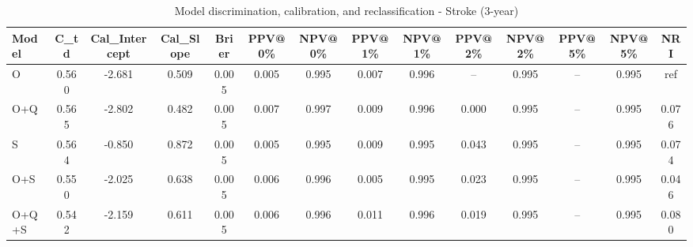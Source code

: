 \begin{table}[htbp]
\centering
\small
\caption{Model discrimination, calibration, and reclassification - Stroke (3-year)}
\label{tab:perf_stroke_3y}
\begin{tabular}{lccccccccccccc}
\toprule
Model & C\_td & Cal\_Intercept & Cal\_Slope & Brier & PPV@0\% & NPV@0\% & PPV@1\% & NPV@1\% & PPV@2\% & NPV@2\% & PPV@5\% & NPV@5\% & NRI \\
\midrule
O & 0.560 & -2.681 & 0.509 & 0.005 & 0.005 & 0.995 & 0.007 & 0.996 & -- & 0.995 & -- & 0.995 & ref \\
O+Q & 0.565 & -2.802 & 0.482 & 0.005 & 0.007 & 0.997 & 0.009 & 0.996 & 0.000 & 0.995 & -- & 0.995 & 0.076 \\
S & 0.564 & -0.850 & 0.872 & 0.005 & 0.005 & 0.995 & 0.009 & 0.995 & 0.043 & 0.995 & -- & 0.995 & 0.074 \\
O+S & 0.550 & -2.025 & 0.638 & 0.005 & 0.006 & 0.996 & 0.005 & 0.995 & 0.023 & 0.995 & -- & 0.995 & 0.046 \\
O+Q+S & 0.542 & -2.159 & 0.611 & 0.005 & 0.006 & 0.996 & 0.011 & 0.996 & 0.019 & 0.995 & -- & 0.995 & 0.080 \\
\bottomrule
\end{tabular}
\end{table}